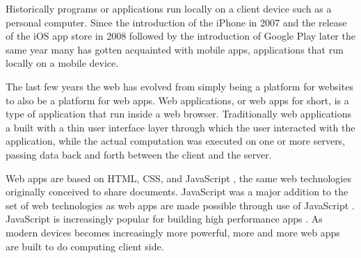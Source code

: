 Historically programs or applications run locally on a client device such as a personal computer. Since the introduction of the iPhone in 2007 and the release of the iOS app store in 2008 followed by the introduction of Google Play later the same year many %
has gotten acquainted with mobile apps, applications that run locally on a mobile device.

The last few years the web has evolved from simply being a platform for websites to also be a platform for web apps. Web applications, or web apps for short, is a type of application that run inside a web browser. Traditionally web applications a built with a thin user interface layer through which the user interacted with the application, while the actual computation was executed on one or more servers, %
passing data back and forth between the client and the server.

Web apps are based on HTML, CSS, and JavaScript \parencite{ParkJungMoon2015}, the same web technologies originally conceived to share documents. JavaScript was a major addition to the set of web technologies as web apps are made possible through use of JavaScript \parencite{ParkJungMoon2015}. JavaScript is increasingly popular for building high performance apps \parencite{SandhuHerreraHendren2018}. As modern devices becomes increasingly more powerful, more and more web apps are built to do computing client side.
